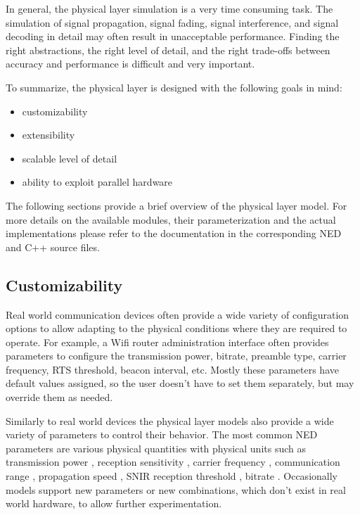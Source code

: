 In general, the physical layer simulation is a very time consuming task. The
simulation of signal propagation, signal fading, signal interference, and signal
decoding in detail may often result in unacceptable performance. Finding the
right abstractions, the right level of detail, and the right trade-offs between
accuracy and performance is difficult and very important.

To summarize, the physical layer is designed with the following goals in mind:
\begin{itemize}
  \item customizability
  \item extensibility
  \item scalable level of detail
  \item ability to exploit parallel hardware
\end{itemize}

The following sections provide a brief overview of the physical layer model. For
more details on the available modules, their parameterization and the actual
implementations please refer to the documentation in the corresponding NED and
C++ source files.

\subsection{Customizability}

Real world communication devices often provide a wide variety of configuration
options to allow adapting to the physical conditions where they are required
to operate. For example, a Wifi router administration interface often provides
parameters to configure the transmission power, bitrate, preamble type, carrier
frequency, RTS threshold, beacon interval, etc. Mostly these parameters have
default values assigned, so the user doesn't have to set them separately, but
may override them as needed.

Similarly to real world devices the physical layer models also provide a wide
variety of parameters to control their behavior. The most common NED parameters
are various physical quantities with physical units such as transmission power
\ttt{[W]}, reception sensitivity \ttt{[W]}, carrier frequency \ttt{[Hz]},
communication range \ttt{[m]}, propagation speed \ttt{[m/s]}, SNIR reception
threshold \ttt{[dB]}, bitrate \ttt{[b/s]}. Occasionally models support new
parameters or new combinations, which don't exist in real world hardware, to
allow further experimentation.

